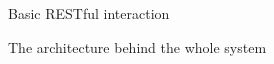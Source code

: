 \documentclass[a4paper,11pt,titlepage]{article}
\begin{document}
	\begin{figure}[H]
    			\caption{Basic RESTful interaction}%
	\end{figure}	
	
	\begin{figure}[H]
    			\caption{The architecture behind the whole system}%
	\end{figure}	
				
\end{document}
